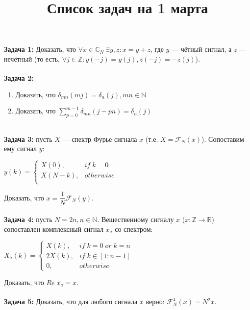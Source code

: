 \documentclass[38pt]{article}
\title{Список задач на 1 марта}
\author{}
\date{}
\begin{document}
\maketitle
\large{

\textbf{Задача 1:} Доказать, что $\forall x \in \mathbb{C}_{N} \; \exists y, z : x = y + z$, где $y$ --- чётный сигнал, а $z$ --- нечётный (то есть, $\forall j \in \mathbb{Z} : y(-j) = \overline{y(j)}, z(-j) = -\overline{z(j)}$). \\ \\

\textbf{Задача 2:}
	\begin{enumerate}
		\item {Доказать, что $\delta_{mn}(mj) = \delta_n(j), mn \in \mathbb{N}$}
		\item {Доказать, что $\sum\limits_{p = 0}^{m - 1} \delta_{mn}(j - pn) = \delta_n(j)$} \\ \\
	\end{enumerate}


\textbf{Задача 3:} пусть $X$ --- спектр Фурье сигнала $x$ (т.е. $X = \mathcal{F}_N(x)$). Сопоставим ему сигнал $y$:

$y(k) = \left\{\begin{matrix}
		X(0), & if\;k = 0 \\
		X(N - k), & otherwise \\
	\end{matrix}\right.$

Доказать, что $x = \dfrac{1}{N} \mathcal{F}_N(y)$. \\ \\


\textbf{Задача 4:} пусть $N = 2n, n \in \mathbb{N}$. Вещественному сигналу $x$ ($x: \mathbb{Z} \rightarrow \mathbb{R}$) сопоставлен комплексный сигнал $x_a$ со спектром:


	$X_a(k) = \left\{\begin{matrix}
			X(k), & if\;k = 0\;or\;k = n \\
			2X(k), & if\;k \in \left[1 : n - 1\right] \\
			0, & otherwise
		\end{matrix}\right.$

Доказать, что $Re\;x_a = x$. \\ \\


\textbf{Задача 5:} Доказать, что для любого сигнала $x$ верно: $\mathcal{F}_N^4(x) = N^2x$.

}
\end{document}
